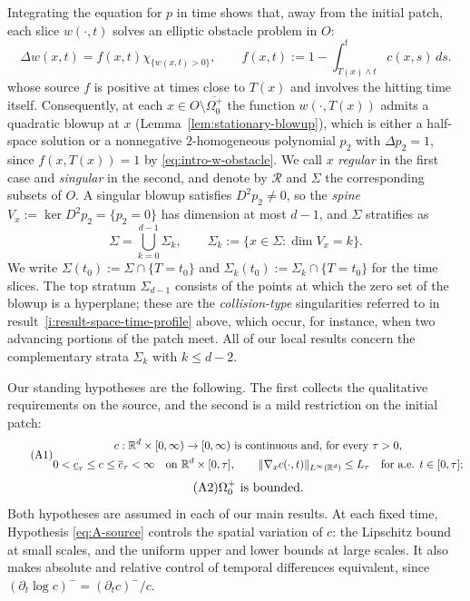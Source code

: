 \documentclass[11pt]{amsart}
\numberwithin{equation}{section}
\numberwithin{figure}{section}
\theoremstyle{plain}
\theoremstyle{definition}
\theoremstyle{remark}
\theoremstyle{plain}
\newcommand{\norm}[1]{\lVert #1 \rVert}
\def\R{\mathbb{R}}
\begin{document}
Integrating the equation for $p$ in time shows that, away from the initial patch, each slice
$w(\cdot,t)$ solves an elliptic obstacle problem  in $O$:
\begin{equation}\label{eq:intro-w-obstacle}
    \Delta w(x,t)=f(x,t)\chi_{\{w(x,t)>0\}},
    \qquad
    f(x,t):=1-\int_{T(x)\wedge t}^{t}c(x,s)\,ds.  
\end{equation}
whose source $f$ is positive at times close to $T(x)$ and involves the hitting time itself.
Consequently, at each $x\in O\setminus\overline{\Omega_0^{+}}$ the function $w(\cdot,T(x))$
admits a quadratic blowup at $x$ (Lemma~\ref{lem:stationary-blowup}), which is either a
half-space solution or a nonnegative $2$-homogeneous polynomial $p_2$ with
$\Delta p_2=1$, since $f(x,T(x))=1$ by \eqref{eq:intro-w-obstacle}. We call $x$ {\it regular} in the first case and {\it singular} in the
second, and denote by $\mathcal R$ and $\Sigma$ the corresponding subsets of $O$. A singular
blowup satisfies $D^2p_2\neq0$, so the {\it spine}
$V_x:=\ker D^2p_2=\{p_2=0\}$ has dimension at most $d-1$, and $\Sigma$ stratifies as
\begin{equation}\label{eq:intro-strata}
    \Sigma=\bigcup_{k=0}^{d-1}\Sigma_k,
    \qquad
    \Sigma_k:=\{x\in\Sigma:\dim V_x=k\}.
\end{equation}
We write $\Sigma(t_0):=\Sigma\cap\{T=t_0\}$ and $\Sigma_k(t_0):=\Sigma_k\cap\{T=t_0\}$ for the
time slices. The top stratum $\Sigma_{d-1}$ consists of the points at which the zero set of
the blowup is a hyperplane; these are the {\it collision-type} singularities referred to in
result~\ref{i:result-space-time-profile} above, which occur, for instance, when two advancing portions of the patch meet. All of our local results
concern the complementary strata $\Sigma_k$ with $k\leq d-2$.


Our standing hypotheses are the following. The first collects the qualitative requirements on
the source, and the second is a mild restriction on the initial patch:
\begin{equation*}\tag{A1}\label{eq:A-source}
\begin{gathered}
    c:\R^d\times[0,\infty)\to[0,\infty)\hbox{ is continuous and, for every }\tau>0,\\
    0<\underline c_\tau\leq c\leq\overline c_\tau<\infty
    \quad\hbox{on }\R^d\times[0,\tau],
    \qquad
    \norm{\nabla_xc(\cdot,t)}_{L^\infty(\R^d)}\leq L_\tau
    \quad\hbox{for a.e. }t\in[0,\tau];
\end{gathered}
\end{equation*}
\begin{equation*}\tag{A2}\label{eq:A-initial}
    \Omega_0^{+}\hbox{ is bounded.}
\end{equation*}
Both hypotheses are assumed in each of our main results. At each fixed time, Hypothesis \eqref{eq:A-source} controls the spatial variation of \(c\): the Lipschitz bound at small scales, and the uniform upper and lower bounds at large scales. It also makes absolute and relative control of temporal differences equivalent, since \((\partial_t\log c)^-=(\partial_t c)^-/c\).
\end{document}
